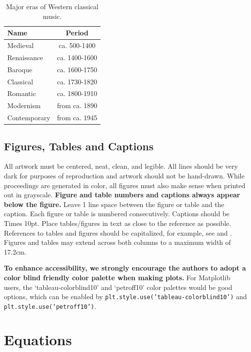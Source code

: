 \documentclass{article}
\begin{document}
\begin{table}[t]
    \centering
    \begin{tabular}{lc}
        \toprule
        \textbf{Name} & \textbf{Period}\\
        \midrule
        Medieval & ca. 500-1400\\
        Renaissance & ca. 1400-1600\\
        Baroque &  ca. 1600-1750\\
        Classical &  ca. 1730-1820\\
        Romantic &  ca. 1800-1910\\
        Modernism & from ca. 1890\\
        Contemporary & from ca. 1945\\
        \bottomrule
    \end{tabular}
    \caption{Major eras of Western classical music.}\label{tab:example}
\end{table}




\subsection{Figures, Tables and Captions}

All artwork must be centered, neat, clean, and legible. All lines should be very dark for purposes of reproduction and artwork should not be hand-drawn. While proceedings are generated in color, all figures must also make sense when printed out in grayscale. \textbf{Figure and table numbers and captions always appear below the figure.} Leave 1 line space between the figure or table and the caption. Each figure or table is numbered consecutively. Captions should be Times 10pt. Place tables/figures in text as close to the reference as possible. References to tables and figures should be capitalized, for example, see  and . Figures and tables may extend across both columns to a maximum width of 17.2cm.

\textbf{To enhance accessibility, we strongly encourage the authors to adopt a color blind friendly color palette when making plots.} For Matplotlib users, the `tableau-colorblind10' and `petroff10' color palettes would be good options, which can be enabled by \texttt{plt.style.use('tableau-colorblind10')} and \texttt{plt.style.use('petroff10')}.


\section{Equations}
\end{document}
